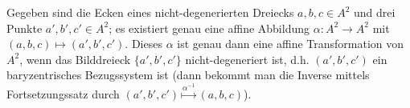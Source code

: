	
		Gegeben sind die Ecken eines nicht-degenerierten Dreiecks $ a,b,c\in A^2 $ und drei Punkte $ a',b',c'\in A^2 $; es existiert genau eine affine Abbildung $ \alpha:A^2\to A^2 $ mit $ (a,b,c)\mapsto (a',b',c') $. Dieses $ \alpha $ ist genau dann eine affine Transformation von $ A^2 $, wenn das Bilddreieck $ \{a',b',c'\} $ nicht-degeneriert ist, d.h. $ (a',b',c') $ ein baryzentrisches Bezugssystem ist (dann bekommt man die Inverse mittels Fortsetzungssatz durch $ (a',b',c') \overset{\alpha^{-1}}{\mapsto} (a,b,c) $).
